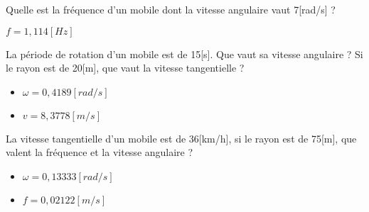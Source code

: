 \begin{exercise}
      Quelle est la fréquence d'un mobile dont la vitesse angulaire vaut 7[rad/s] ?
\end{exercise}
\begin{solution}
      \(f=1,114[Hz]\)
\end{solution}

\begin{exercise}
      La période de rotation d'un mobile est de 15[s]. Que vaut sa vitesse angulaire ? Si le rayon est de 20[m], que vaut la vitesse tangentielle ?
\end{exercise}
\begin{solution}
      \begin{itemize}
            \item \(\omega=0,4189[rad/s]\)
            \item  \(v=8,3778[m/s]\)
      \end{itemize}
\end{solution}

\begin{exercise}
      La vitesse tangentielle d'un mobile est de 36[km/h], si le rayon est de 75[m], que valent la fréquence et la vitesse angulaire ?
\end{exercise}
\begin{solution}
      \begin{itemize}
            \item \(\omega=0,13333[rad/s]\)
            \item  \(f=0,02122[m/s]\)
      \end{itemize}
\end{solution}